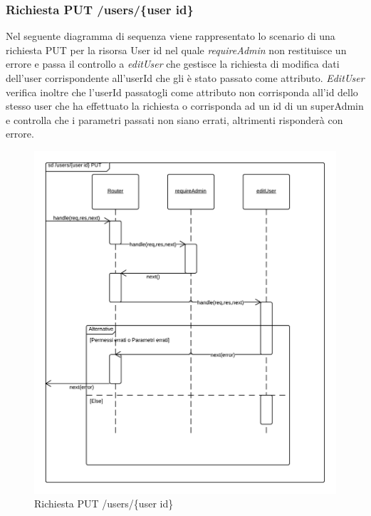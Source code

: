 \subsubsection{Richiesta PUT /users/\{user id\}} 
Nel seguente diagramma di sequenza viene rappresentato lo scenario di una richiesta PUT per la risorsa User id nel quale \emph{requireAdmin} non restituisce un errore e passa il controllo a \emph{editUser} che gestisce la richiesta di modifica dati dell'user corrispondente all'userId che gli è stato passato come attributo.
\emph{EditUser} verifica inoltre che l'userId passatogli come attributo non corrisponda all'id dello stesso user che ha effettuato la richiesta o corrisponda ad un id di un superAdmin e controlla che i parametri passati non siano errati, altrimenti risponderà con errore.
\begin{figure}[H]
	\begin{center} 
		\includegraphics[scale=0.20]{scenari/Users Id PUT.png} 
		\caption{Richiesta PUT /users/\{user id\}}
	\end{center} 
\end{figure}

\pagebreak

